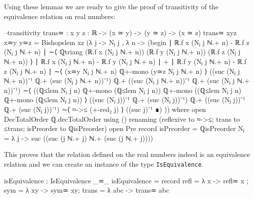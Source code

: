 \documentclass[11pt,a4paper]{article}
\begin{document}
Using these lemmas we are ready to give the proof of transitivity of the equivalence relation on real numbers:
\begin{code}
  --transitivity
  trans≃ : {x y z : ℝ} -> (x ≃ y) -> (y ≃ z) -> (x ≃ z)
  trans≃ {x}{y}{z} x≃y y≃z = Bishopslem {x}{z} (λ {j} -> 
    Nⱼ {j} , λ {n} -> (begin 
    ∣ ℝ.f x (Nⱼ {j} ℕ.+ n) - ℝ.f z (Nⱼ {j} ℕ.+ n) ∣ 
      ∼⟨ ℚtriang (ℝ.f x (Nⱼ {j} ℕ.+ n)) (ℝ.f y (Nⱼ {j} ℕ.+ n)) (ℝ.f z (Nⱼ {j} ℕ.+ n)) ⟩
    ∣ ℝ.f x (Nⱼ {j} ℕ.+ n) - ℝ.f y (Nⱼ {j} ℕ.+ n) ∣ + 
    ∣ ℝ.f y (Nⱼ {j} ℕ.+ n) - ℝ.f z (Nⱼ {j} ℕ.+ n) ∣
    ∼⟨ (x≃y {Nⱼ {j} ℕ.+ n}) ℚ+-mono (y≃z {Nⱼ {j} ℕ.+ n}) ⟩ 
    ((suc (Nⱼ {j} ℕ.+ n))⁻¹ ℚ.+ (suc (Nⱼ {j} ℕ.+ n))⁻¹) ℚ.+ 
    ((suc (Nⱼ {j} ℕ.+ n))⁻¹ ℚ.+ (suc (Nⱼ {j} ℕ.+ n))⁻¹)
    ∼⟨ ((ℚ≤lem {Nⱼ {j}} {n}) ℚ+-mono (ℚ≤lem {Nⱼ {j}} {n})) 
           ℚ+-mono 
         ((ℚ≤lem {Nⱼ {j}} {n}) ℚ+-mono (ℚ≤lem {Nⱼ {j}} {n})) ⟩ 
    ((suc (Nⱼ {j}))⁻¹ ℚ.+ (suc (Nⱼ {j}))⁻¹) ℚ.+ 
    ((suc (Nⱼ {j}))⁻¹ ℚ.+ (suc (Nⱼ {j}))⁻¹) 
    ∼⟨ ≈->≤ (+-red₂ j) ⟩ 
    ((suc j)⁻¹ ∎) ))
    where
      open DecTotalOrder ℚ.decTotalOrder using () 
        renaming (reflexive to ≈->≤; trans to ≤trans; isPreorder to ℚisPreorder)
      open Pre record {isPreorder = ℚisPreorder}
      Nⱼ = λ {j} -> suc ((suc (j ℕ.+ j) ℕ.+ (suc (j ℕ.+ j))))
\end{code}
This proves that the relation defined on the real numbers indeed is an equivalence relation and we can create an instance of the type \texttt{IsEquivalence}.
\begin{code}
isEquivalence : IsEquivalence _≃_
isEquivalence = record {
  refl = λ {x} -> refl≃ {x} ;
  sym = λ {x}{y} -> sym≃ {x}{y};
  trans = λ {a}{b}{c} -> trans≃ {a}{b}{c}
  }
\end{code}
\end{document}

